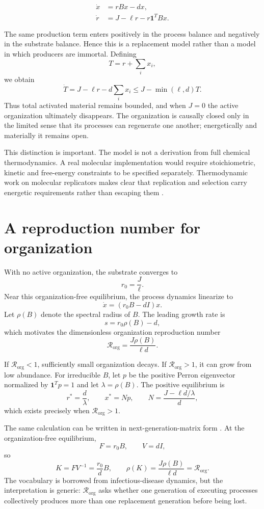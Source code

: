 \documentclass[11pt]{article}
\newcommand{\Rorg}{\mathcal R_{\mathrm{org}}}
\begin{document}
\begin{align}
\dot x &= rBx-dx, \\
\dot r &= J-\ell r-r\mathbf 1^{\!T}Bx.
\label{eq:base}
\end{align}

The same production term enters positively in the process balance and negatively in the substrate balance. Hence this is a replacement model rather than a model in which producers are immortal. Defining
\[
T=r+\sum_i x_i,
\]
we obtain
\[
\dot T=J-\ell r-d\sum_i x_i
\le J-\min(\ell,d)T.
\]
Thus total activated material remains bounded, and when $J=0$ the active organization ultimately disappears. The organization is causally closed only in the limited sense that its processes can regenerate one another; energetically and materially it remains open.

This distinction is important. The model is not a derivation from full chemical thermodynamics. A real molecular implementation would require stoichiometric, kinetic and free-energy constraints to be specified separately. Thermodynamic work on molecular replicators makes clear that replication and selection carry energetic requirements rather than escaping them \citep{kolchinsky2025}.

\section{A reproduction number for organization}

With no active organization, the substrate converges to
\[
r_0=\frac{J}{\ell}.
\]
Near this organization-free equilibrium, the process dynamics linearize to
\[
\dot x=(r_0B-dI)x.
\]
Let $\rho(B)$ denote the spectral radius of $B$. The leading growth rate is
\[
s=r_0\rho(B)-d,
\]
which motivates the dimensionless organization reproduction number
\begin{equation}
\boxed{
\Rorg=\frac{J\rho(B)}{\ell d}.
}
\label{eq:Rorg}
\end{equation}

If $\Rorg<1$, sufficiently small organization decays. If $\Rorg>1$, it can grow from low abundance. For irreducible $B$, let $p$ be the positive Perron eigenvector normalized by $\mathbf 1^Tp=1$ and let $\lambda=\rho(B)$. The positive equilibrium is
\[
r^*=\frac d\lambda,
\qquad
x^*=Np,
\qquad
N=\frac{J-\ell d/\lambda}{d},
\]
which exists precisely when $\Rorg>1$.

The same calculation can be written in next-generation-matrix form \citep{vddwatmough2002}. At the organization-free equilibrium,
\[
F=r_0B,
\qquad
V=dI,
\]
so
\[
K=FV^{-1}=\frac{r_0}{d}B,
\qquad
\rho(K)=\frac{J\rho(B)}{\ell d}=\Rorg.
\]
The vocabulary is borrowed from infectious-disease dynamics, but the interpretation is generic: $\Rorg$ asks whether one generation of executing processes collectively produces more than one replacement generation before being lost.
\end{document}
